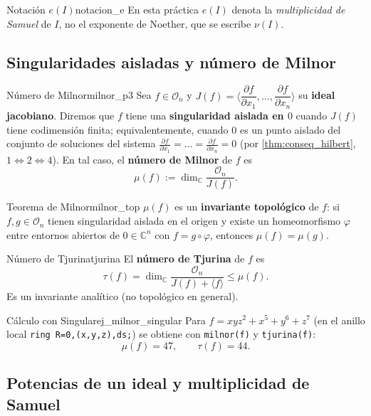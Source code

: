 \documentclass[11pt,a4paper]{article}
\begin{document}
\begin{nota}{Notación $e(I)$}{notacion_e}
En esta práctica $e(I)$ denota la \emph{multiplicidad de Samuel} de $I$, no el exponente de Noether, que se escribe $\nu(I)$.
\end{nota}

\subsection*{Singularidades aisladas y número de Milnor}

\begin{definicion}{Número de Milnor}{milnor_p3}
Sea $f \in \mathcal{O}_n$ y $J(f) = \Big\langle \dfrac{\partial f}{\partial x_1}, \dots, \dfrac{\partial f}{\partial x_n} \Big\rangle$ su \textbf{ideal jacobiano}. Diremos que $f$ tiene una \textbf{singularidad aislada en $0$} cuando $J(f)$ tiene codimensión finita; equivalentemente, cuando $0$ es un punto aislado del conjunto de soluciones del sistema $\frac{\partial f}{\partial x_1} = \dots = \frac{\partial f}{\partial x_n} = 0$ (por \cref{thm:conseq_hilbert}, $1 \iff 2 \iff 4$). En tal caso, el \textbf{número de Milnor} de $f$ es
$$ \mu(f) := \dim_{\mathbb{C}} \frac{\mathcal{O}_n}{J(f)}. $$
\end{definicion}

\begin{teorema}{Teorema de Milnor}{milnor_top}
$\mu(f)$ es un \textbf{invariante topológico} de $f$: si $f, g \in \mathcal{O}_n$ tienen singularidad aislada en el origen y existe un homeomorfismo $\varphi$ entre entornos abiertos de $0 \in \mathbb{C}^n$ con $f = g \circ \varphi$, entonces $\mu(f) = \mu(g)$.
\end{teorema}

\begin{definicion}{Número de Tjurina}{tjurina}
El \textbf{número de Tjurina} de $f$ es
$$ \tau(f) = \dim_{\mathbb{C}} \frac{\mathcal{O}_n}{J(f) + \langle f \rangle} \le \mu(f). $$
Es un invariante analítico (no topológico en general).
\end{definicion}

\begin{observacion}{Cálculo con Singular}{ej_milnor_singular}
Para $f = xyz^2 + x^5 + y^6 + z^7$ (en el anillo local \texttt{ring R=0,(x,y,z),ds;}) se obtiene con \texttt{milnor(f)} y \texttt{tjurina(f)}:
$$ \mu(f) = 47, \qquad \tau(f) = 44. $$
\end{observacion}

\subsection*{Potencias de un ideal y multiplicidad de Samuel}
\end{document}

